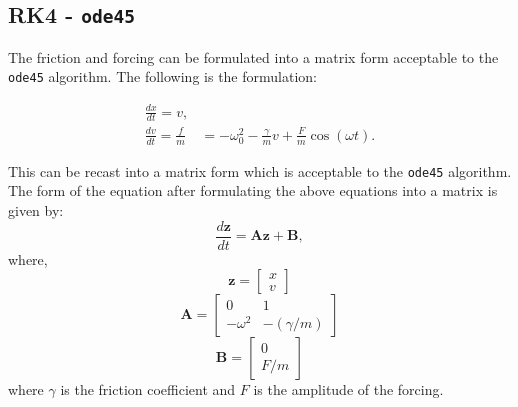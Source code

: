 \documentclass[10pt]{article}
\begin{document}
\subsection*{RK4 - \texttt{ode45}}
The friction and forcing can be formulated into a matrix form acceptable to the \texttt{ode45} algorithm. The following is the formulation:

\begin{eqnarray}
\frac{dx}{dt}=v, \\
\frac{dv}{dt}=\frac{f}{m} &= -\omega_{0}^2 -\frac{\gamma}{m} v + \frac{F}{m}\cos(\omega t).
\end{eqnarray}

This can be recast into a matrix form which is acceptable to the \texttt{ode45} algorithm. The form of the equation after formulating the above equations into a matrix is given by:
%
\begin{equation}
\frac{d\bm{z}}{dt} = \bm{A}\bm{z} + \bm{B},
\end{equation}
%
where,
%
\begin{equation}
\bm{z} = 
\begin{bmatrix}
x \\
v 
\end{bmatrix}
\end{equation}
%
\begin{equation}
\bm{A} = 
\begin{bmatrix}
0 & 1 \\
-\omega^2 & -(\gamma/m)
\end{bmatrix}
\end{equation}
%
\begin{equation}
\bm{B} = 
\begin{bmatrix}
0 \\
F/m
\end{bmatrix}
\end{equation}
where $\gamma$ is the friction coefficient and $F$ is the amplitude of the forcing. 
\end{document}
